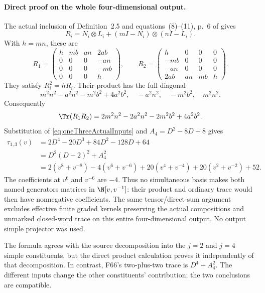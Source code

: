 \documentclass[11pt,a4paper]{article}
\newcommand{\fid}[1]{\textsf{#1}}\newcommand{\gate}[1]{\textsf{#1}}
\theoremstyle{named}\newtheorem{finding}{Finding}[section]
\theoremstyle{definition}\newtheorem{definition}[finding]{Definition}
\theoremstyle{remark}\newtheorem{remark}[finding]{Remark}
\begin{document}
\paragraph{Direct proof on the whole four-dimensional output.}
The actual inclusion of Definition~2.5 and
equations~(8)--(11), p.~6 of
\cite{BlasiakChebyshev} gives
\[
 R_i=N_i\otimes L_i+(mI-N_i)\otimes(nI-L_i).
\]
With \(h=mn\), these are
\begin{equation}\label{eq:oneThreeFullMatrices}
 R_1=\begin{pmatrix}
 h&mb&an&2ab\\0&0&0&-an\\0&0&0&-mb\\0&0&0&h
 \end{pmatrix},\qquad
 R_2=\begin{pmatrix}
 h&0&0&0\\-mb&0&0&0\\-an&0&0&0\\2ab&an&mb&h
 \end{pmatrix}.
\end{equation}
They satisfy \(R_i^2=hR_i\).
Their product has the full diagonal
\[
 m^2n^2-a^2n^2-m^2b^2+4a^2b^2,\quad
        -a^2n^2,\quad -m^2b^2,\quad m^2n^2.
\]
Consequently
\[
 \Tr(R_1R_2)=2m^2n^2-2a^2n^2-2m^2b^2+4a^2b^2.
\]
Substitution of \eqref{eq:oneThreeActualInputs}
and \(A_4=D^2-8D+8\) gives
\begin{equation}\label{eq:oneThreeNegativeTrace}
\begin{split}
 \tau_{1,3}(v)
 &=2D^4-20D^3+84D^2-128D+64\\
 &=D^2(D-2)^2+A_4^2\\
 &=2(v^8+v^{-8})-4(v^6+v^{-6})
       +20(v^4+v^{-4})+20(v^2+v^{-2})+52.
\end{split}
\end{equation}
The coefficients at \(v^{6}\) and \(v^{-6}\)
are \(-4\). Thus no simultaneous basis makes
both named generators matrices in
\(\N[v,v^{-1}]\): their product and ordinary
trace would then have nonnegative coefficients.
The same tensor/direct-sum argument excludes
effective finite graded kernels preserving
the actual compositions and unmarked closed-word
trace on this entire four-dimensional output.
No output simple projector was used.

The formula agrees with the source decomposition
into the \(j=2\) and \(j=4\) simple constituents,
but the direct product calculation proves it
independently of that decomposition.
In contrast, \fid{F66}'s two-plus-two trace
is \(D^4+A_4^2\).
The different inputs change the other constituents'
contribution; the two conclusions are compatible.
\end{document}
